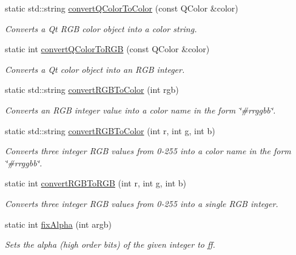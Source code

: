 \begin{DoxyCompactItemize}
static std\+::string \mbox{\hyperlink{classGColor_a2ad78585a77dad65eb23299714545f7c}{convert\+Q\+Color\+To\+Color}} (const Q\+Color \&color)
\begin{DoxyCompactList}\small\item\em Converts a Qt R\+GB color object into a color string. \end{DoxyCompactList}\item 
static int \mbox{\hyperlink{classGColor_a30f06933a10f00500d6b7991f8b61dde}{convert\+Q\+Color\+To\+R\+GB}} (const Q\+Color \&color)
\begin{DoxyCompactList}\small\item\em Converts a Qt color object into an R\+GB integer. \end{DoxyCompactList}\item 
static std\+::string \mbox{\hyperlink{classGColor_a64353dd79967412aeebe46219e4a71df}{convert\+R\+G\+B\+To\+Color}} (int rgb)
\begin{DoxyCompactList}\small\item\em Converts an R\+GB integer value into a color name in the form {\ttfamily \char`\"{}\#rrggbb\char`\"{}}. \end{DoxyCompactList}\item 
static std\+::string \mbox{\hyperlink{classGColor_a906729a293e62f8d112037016af21f9f}{convert\+R\+G\+B\+To\+Color}} (int r, int g, int b)
\begin{DoxyCompactList}\small\item\em Converts three integer R\+GB values from 0-\/255 into a color name in the form {\ttfamily \char`\"{}\#rrggbb\char`\"{}}. \end{DoxyCompactList}\item 
static int \mbox{\hyperlink{classGColor_a7c4acb134cfa913f8a127b300a4b10a0}{convert\+R\+G\+B\+To\+R\+GB}} (int r, int g, int b)
\begin{DoxyCompactList}\small\item\em Converts three integer R\+GB values from 0-\/255 into a single R\+GB integer. \end{DoxyCompactList}\item 
static int \mbox{\hyperlink{classGColor_a0dd42e0c5898738e5edb542e06b7496c}{fix\+Alpha}} (int argb)
\begin{DoxyCompactList}\small\item\em Sets the \textquotesingle{}alpha\textquotesingle{} (high order bits) of the given integer to ff. \end{DoxyCompactList}\item 

\end{DoxyCompactItemize}
